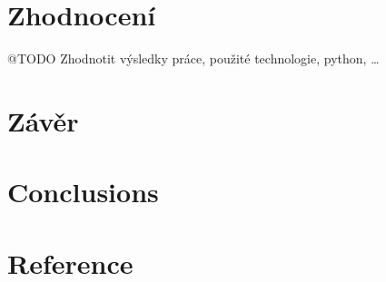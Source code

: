 \documentclass[10pt,a4paper]{article}
\begin{document}
	\section{Zhodnocení}
	@TODO Zhodnotit výsledky práce, použité technologie, python, \dots

	\section{Závěr} %


	\section{Conclusions} %

	\section{Reference} %

\end{document}
